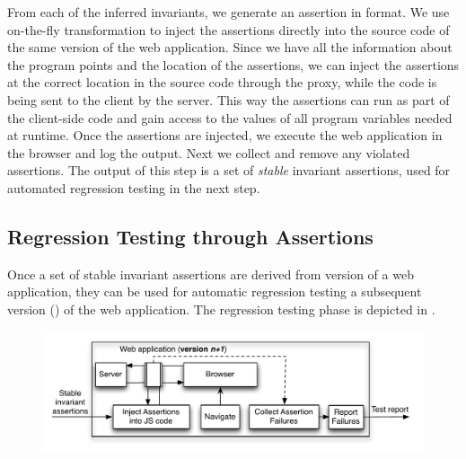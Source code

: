 From each of the inferred invariants, we generate an assertion in \javascript format. We use on-the-fly transformation to inject the assertions directly into the source code of the same version of the web application. Since we have all the information about the program points and the location 
of the assertions, we can inject the assertions at the correct location in the \javascript source code through the proxy, while the code is being  
 sent to the client by the server. This way the assertions can run as part of the client-side code and gain access to the values of all program variables needed at runtime. Once the assertions are injected, we execute the web application in the browser and log the output. Next we collect and remove any violated assertions. The output of this step is a set of \emph{stable} invariant assertions, used for automated regression testing in the next step.

\subsection{Regression Testing through Assertions}
Once a set of stable invariant assertions are derived from version  of a web application, they can be used for automatic regression testing a subsequent version () of the web application. The regression testing phase is depicted in .


 


\begin{figure}[t]
\centering
\includegraphics[width=0.9\hsize]{fig/regression-testing}
\label{Fig:testingDiagram}
\end{figure}

